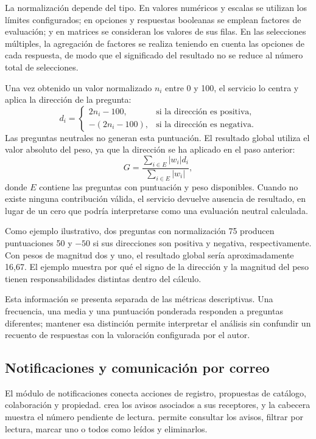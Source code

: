 \documentclass[11pt,a4paper]{report}
\newcommand{\code}[1]{\texttt{\small\detokenize{#1}}}
\begin{document}
La normalización depende del tipo. En valores numéricos y escalas se utilizan los límites configurados; en opciones y respuestas booleanas se emplean factores de evaluación; y en matrices se consideran los valores de sus filas. En las selecciones múltiples, la agregación de factores se realiza teniendo en cuenta las opciones de cada respuesta, de modo que el significado del resultado no se reduce al número total de selecciones.

Una vez obtenido un valor normalizado $n_i$ entre 0 y 100, el servicio lo centra y aplica la dirección de la pregunta:
\[
 d_i = \begin{cases}
 2n_i-100, & \text{si la dirección es positiva},\\
 -(2n_i-100), & \text{si la dirección es negativa}.
 \end{cases}
\]
Las preguntas neutrales no generan esta puntuación. El resultado global utiliza el valor absoluto del peso, ya que la dirección se ha aplicado en el paso anterior:
\[
 G=\frac{\sum_{i\in E}|w_i|d_i}{\sum_{i\in E}|w_i|},
\]
\noindent donde $E$ contiene las preguntas con puntuación y peso disponibles. Cuando no existe ninguna contribución válida, el servicio devuelve ausencia de resultado, en lugar de un cero que podría interpretarse como una evaluación neutral calculada.

Como ejemplo ilustrativo, dos preguntas con normalización 75 producen puntuaciones 50 y $-50$ si sus direcciones son positiva y negativa, respectivamente. Con pesos de magnitud dos y uno, el resultado global sería aproximadamente 16,67. El ejemplo muestra por qué el signo de la dirección y la magnitud del peso tienen responsabilidades distintas dentro del cálculo.

Esta información se presenta separada de las métricas descriptivas. Una frecuencia, una media y una puntuación ponderada responden a preguntas diferentes; mantener esa distinción permite interpretar el análisis sin confundir un recuento de respuestas con la valoración configurada por el autor.

\subsection{Notificaciones y comunicación por correo}

El módulo de notificaciones conecta acciones de registro, propuestas de catálogo, colaboración y propiedad. \code{NotificationService} crea los avisos asociados a sus receptores, y la cabecera muestra el número pendiente de lectura. \code{NotificationsModal} permite consultar los avisos, filtrar por lectura, marcar uno o todos como leídos y eliminarlos.
\end{document}
